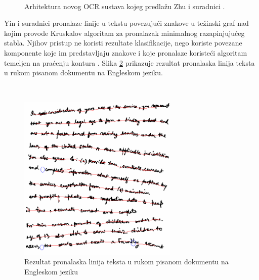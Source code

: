 \documentclass[times, utf8, zavrsni]{fer}
\begin{document}
\

\begin{figure}[htb]
    \centering
    \captionsetup{justification=centering,margin=2cm}
    \caption{Arhitektura novog OCR sustava kojeg predlažu Zhu i suradnici \citep{zhu2016novel}.}
    \label{fig:novel-ocr}
\end{figure}

\pagebreak

Yin i suradnici \citep{yin2007handwritten} pronalaze linije u tekstu povezujući znakove u težinski
graf nad kojim provode Kruskalov algoritam za pronalazak minimalnog razapinjujućeg stabla. Njihov
pristup ne koristi rezultate klasifikacije, nego koriste povezane komponente koje im predstavljaju
znakove i koje pronalaze koristeći algoritam temeljen na praćenju kontura .
Slika \ref{fig:mst-example-01} prikazuje rezultat pronalaska linija teksta u rukom pisanom dokumentu na
Engleskom jeziku.

\

\begin{figure}[htb]
    \centering
    \captionsetup{justification=centering,margin=2cm}
    \includegraphics[height=8cm]{images/mst-example-01.png}
    \caption{Rezultat pronalaska linija teksta u rukom pisanom dokumentu na Engleskom jeziku \citep{yin2007handwritten}}
    \label{fig:mst-example-01}
\end{figure}
\end{document}
